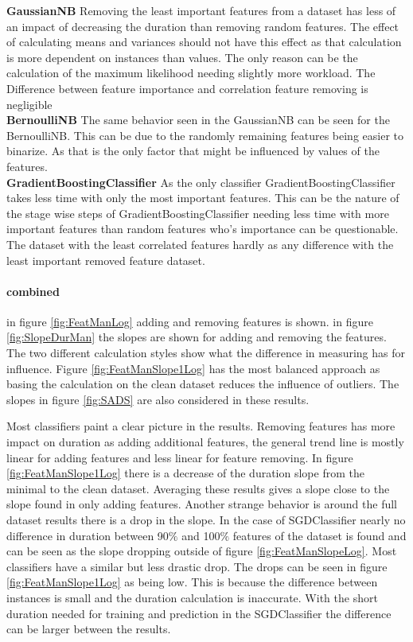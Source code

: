 \documentclass[a4paper,10pt]{article}
\begin{document}
\textbf{GaussianNB} Removing the least important features from a dataset has less of an impact of decreasing the duration than removing random features. The effect of calculating means and variances should not have this effect as that calculation is more dependent on instances than values. The only reason can be the calculation of the maximum likelihood needing slightly more workload. The Difference between feature importance and correlation feature removing is negligible \\

\textbf{BernoulliNB} The same behavior seen in the GaussianNB can be seen for the BernoulliNB. This can be due to the randomly remaining features being easier to binarize. As that is the only factor that might be influenced by values of the features. \\

\textbf{GradientBoostingClassifier} As the only classifier GradientBoostingClassifier takes less time with only the most important features. This can be the nature of the stage wise steps of GradientBoostingClassifier needing less time with more important features than random features who's importance can be questionable. The dataset with the least correlated features hardly as any difference with the least important removed feature dataset.\\


\paragraph{combined}
in figure \ref{fig:FeatManLog} adding and removing features is shown.
in figure \ref{fig:SlopeDurMan} the slopes are shown for adding and removing the features. The two different calculation styles show what the difference in measuring has for influence. Figure \ref{fig:FeatManSlope1Log} has the most balanced approach as basing the calculation on the clean dataset reduces the influence of outliers. The slopes in figure \ref{fig:SADS} are also considered in these results.

Most classifiers paint a clear picture in the results. Removing features has more impact on duration as adding additional features, the general trend line is mostly linear for adding features and less linear for feature removing. In figure \ref{fig:FeatManSlope1Log} there is a decrease of the duration slope from the minimal to the clean dataset. Averaging these results gives a slope close to the slope found in only adding features. Another strange behavior is around the full dataset results there is a drop in the slope. In the case of SGDClassifier nearly no difference in duration between 90$\%$ and 100$\%$ features of the dataset is found and can be seen as the slope dropping outside of figure \ref{fig:FeatManSlopeLog}. Most classifiers have a similar but less drastic drop. The drops can be seen in figure \ref{fig:FeatManSlope1Log} as being low. This is because the difference between instances is small and the duration calculation  is inaccurate. With the short duration needed for training and prediction in the SGDClassifier the difference can be larger between the results. 
\end{document}
